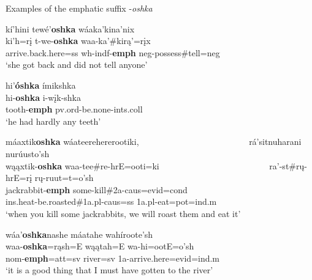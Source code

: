 \begin{exe}

\item\label{EMPHsuffix} Examples of the emphatic suffix -\textit{oshka}

    \begin{xlist}
    
    \item\label{EMPHsuffix1} \glll kí'hini tewé'\textbf{oshka} wáaka'kina'nix\\
    ki'h=rį t-we-\textbf{oshka} waa-ka'\#kirą'=rįx\\
    \textnormal{arrive.back.here}=ss wh-indf-\textbf{emph} neg-\textnormal{possess}\#\textnormal{tell}=neg\\
    \glt `she got back and did not tell anyone' \citep[79]{hollow1973a}
    
    \item\label{EMPHsuffix2} \glll hi'\textbf{óshka} ímikshka\\
    hi-\textbf{oshka} i-wįk-shka\\
    \textnormal{tooth}-\textbf{emph} pv.ord-\textnormal{be.none}-ints.coll\\
    \glt `he had hardly any teeth' \citep[181]{hollow1973a}
    
    \item\label{EMPHsuffix3} \glll máaxtik\textbf{oshka} wáateerehererootiki, ~ ~ ~ ~ ~ ~ ~ ~ ~ ~ ~ ~ ~ ~ ~ rá'sitnuharani nurúusto'sh\\
    wąąxtik-\textbf{oshka} waa-tee\#re-hrE=ooti=ki ~ ~ ~ ~ ~ ~ ~ ~ ~ ~ ~ ~ ~ ~ ~ ra'-st\#rų-hrE=rį rų-ruut=t=o'sh\\
    \textnormal{jackrabbit}-\textbf{emph} \textnormal{some}-\textnormal{kill}\#2a-caus=evid=cond ~ ~ ~ ~ ~ ~ ~ ~ ~ ~ ~ ~ ~ ~ ~ ins.heat-\textnormal{be.roasted}\#1a.pl-caus=ss 1a.pl-\textnormal{eat}=pot=ind.m\\
    \glt `when you kill some jackrabbits, we will roast them and eat it' \citep[195]{hollow1973a}
    
    \item\label{EMPHsuffix4} \glll wáa'\textbf{oshka}nashe máatahe wahíroote'sh\\
    waa-\textbf{oshka}=rąsh=E wąątah=E wa-hi=ootE=o'sh\\
    nom-\textbf{emph}=att=sv \textnormal{river}=sv 1a-\textnormal{arrive.here}=evid=ind.m\\
    \glt `it is a good thing that I must have gotten to the river' \citep[36]{hollow1973a}
    
    \end{xlist}

\end{exe}

